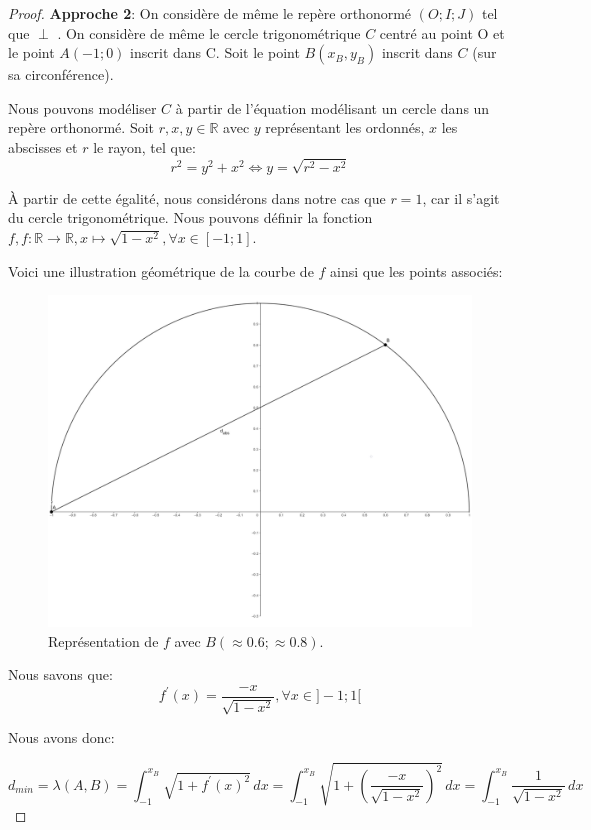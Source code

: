 \documentclass{amsart}
\theoremstyle{definition}
\theoremstyle{remark}
\numberwithin{equation}{section}
\renewcommand*{\overrightarrow}[1]{\vbox{\halign{##\cr 
  \tiny\rightarrowfill\cr\noalign{\nointerlineskip\vskip1pt} 
  $#1\mskip2mu$\cr}}}
\begin{document}
\begin{proof}
  \textbf{Approche 2}: On considère de même le repère orthonormé $(O;I;J)$ tel que \overrightarrow{OI} $\perp$ \overrightarrow{OJ}. On considère de même le cercle trigonométrique $C$ centré au point O et le point $A(-1;0)$ inscrit dans C. Soit le point
  $B(x_B,y_B)$ inscrit dans $C$ (sur sa circonférence).

  Nous pouvons modéliser $C$ à partir de l'équation modélisant un cercle dans un repère orthonormé. Soit $r,x,y\in\mathbb{R}$ avec $y$ représentant les ordonnés, $x$ les abscisses et $r$ le rayon, tel que:
  \[r^2=y^2+x^2 \Leftrightarrow  y = \sqrt{r^2-x^2}\]

  À partir de cette égalité, nous considérons dans notre cas que $r=1$, car il s'agit du cercle trigonométrique. Nous pouvons définir la fonction $f,f:\mathbb{R}\longrightarrow \mathbb{R}, x\longmapsto \sqrt{1-x^2}, \forall x\in[-1;1]$.

  Voici une illustration géométrique de la courbe de $f$ ainsi que les points associés:

  \begin{figure}[H]
    \centering
    \includegraphics[scale=0.1]{images/angle_function.png}
    \caption{Représentation de $f$ avec $B(\approx0.6;\approx0.8)$.}
  \end{figure}

  Nous savons que: \[f^\prime(x)=\frac{-x}{\sqrt{1-x^2}}, \forall x\in]-1;1[\]

  Nous avons donc:

  \[d_{min}=\lambda(A,B)=\int_{-1}^{x_B} \sqrt{1+{f^\prime}(x)^2} \,dx=\int_{-1}^{x_B} \sqrt{1+(\frac{-x}{\sqrt{1-x^2}})^2}\,dx=\int_{-1}^{x_B} \frac{1}{\sqrt{1-x^2}}\,dx\]


\end{proof}
\end{document}
